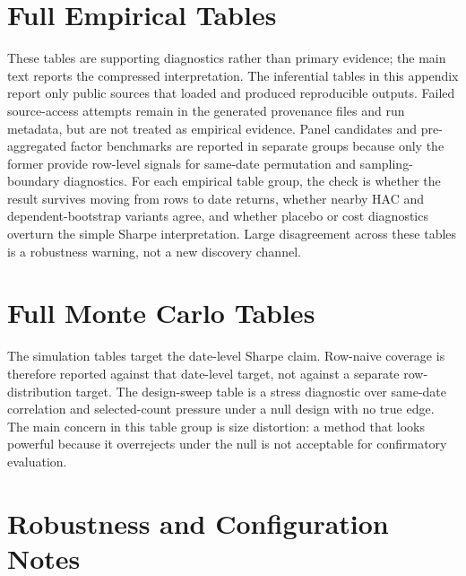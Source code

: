 \documentclass[12pt,a4paper]{article}
\begin{document}


\section{Full Empirical Tables}

These tables are supporting diagnostics rather than primary evidence; the main text
reports the compressed interpretation.
The inferential tables in this appendix report only public sources that
loaded and produced reproducible outputs.  Failed source-access
attempts remain in the generated provenance files and run metadata,
but are not treated as empirical evidence.
Panel candidates and pre-aggregated factor benchmarks are reported in
separate groups because only the former provide row-level signals for
same-date permutation and sampling-boundary diagnostics.
For each empirical table group, the check is whether the result survives
moving from rows to date returns, whether nearby HAC and dependent-bootstrap
variants agree, and whether placebo or cost diagnostics overturn the simple
Sharpe interpretation.  Large disagreement across these tables is a
robustness warning, not a new discovery channel.



\section{Full Monte Carlo Tables}

The simulation tables target the date-level Sharpe claim.  Row-naive
coverage is therefore reported against that date-level target, not
against a separate row-distribution target.  The design-sweep table is a
stress diagnostic over same-date correlation and selected-count pressure
under a null design with no true edge.
The main concern in this table group is size distortion: a method that
looks powerful because it overrejects under the null is not acceptable
for confirmatory evaluation.



\section{Robustness and Configuration Notes}
\end{document}
